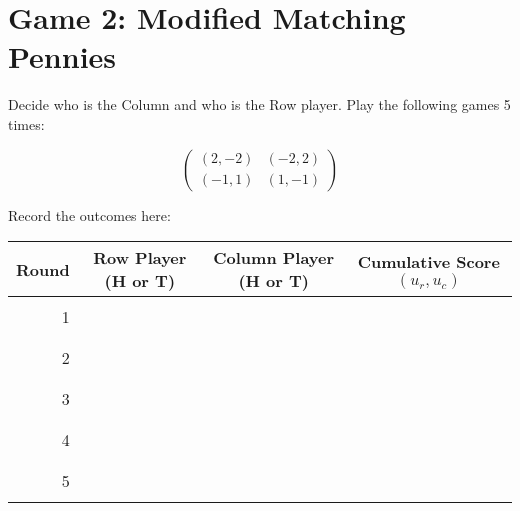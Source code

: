\documentclass{article}
\begin{document}
\newpage
\section{Game 2: Modified Matching Pennies}

Decide who is the Column and who is the Row player. Play the following games 5 times:

$$\begin{pmatrix}
(2,-2) & (-2, 2)\\
(-1,1) & (1,-1)
\end{pmatrix}$$

Record the outcomes here:

\begin{center}
\begin{tabular}{r|c|c|c}
\toprule
Round         & Row Player (H or T) & Column Player (H or T) & Cumulative Score $(u_r,u_c)$\\
\midrule
              &                     &                        & \\
1             &                     &                        & \\
              &                     &                        & \\
              &                     &                        & \\
2             &                     &                        & \\
              &                     &                        & \\
              &                     &                        & \\
3             &                     &                        & \\
              &                     &                        & \\
              &                     &                        & \\
4             &                     &                        & \\
              &                     &                        & \\
              &                     &                        & \\
5             &                     &                        & \\
              &                     &                        & \\
\bottomrule
\end{tabular}
\end{center}
\end{document}
